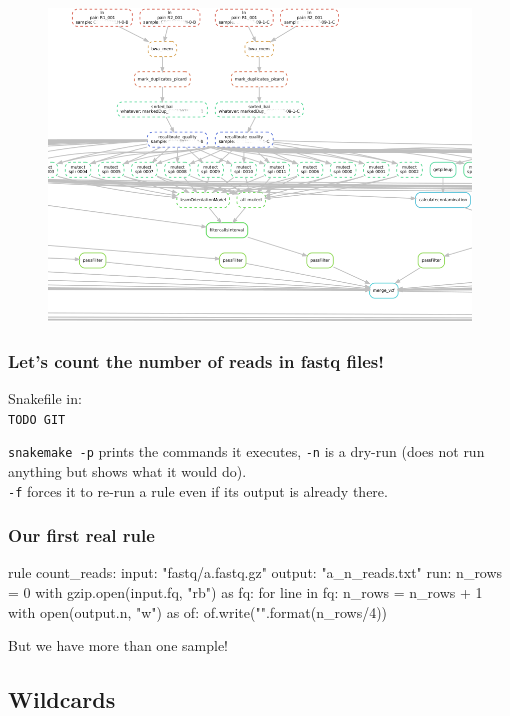 \documentclass[xcolor=table]{beamer}
\begin{document}
\begin{frame}
\begin{figure}\includegraphics[width=1\textwidth]{./img/dag.png}\end{figure}
\end{frame}

\begin{frame}
\frametitle{Let's count the number of reads in fastq files!}
Snakefile in: \\
\texttt{TODO GIT}

\texttt{snakemake -p} prints the commands it executes, \texttt{-n} is a dry-run (does not run anything but shows what it would do).
\\
\texttt{-f} forces it to re-run a rule even if its output is already there.
\end{frame}

\begin{frame}[fragile]
\frametitle{Our first real rule}
\begin{python}
rule count_reads:
	input: "fastq/a.fastq.gz"
	output: "a_n_reads.txt"
	run: 
		n_rows = 0
		with gzip.open(input.fq, "rb") as fq:
		    for line in fq:
		        n_rows = n_rows + 1
		with open(output.n, "w") as of:
		    of.write("{}\n".format(n_rows/4))

\end{python}
But we have more than one sample!
\end{frame}

\subsection{Wildcards}
\end{document}
